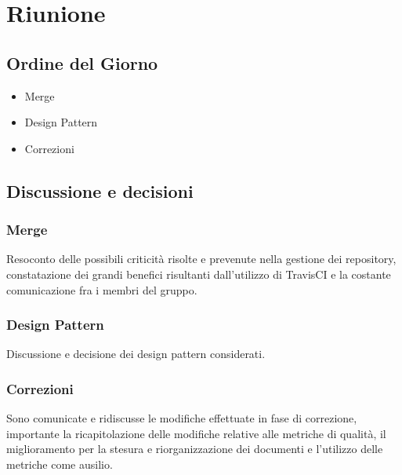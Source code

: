 \section{Riunione}
\subsection{Ordine del Giorno}
\begin{itemize}
	\item Merge
	\item Design Pattern
	\item Correzioni
\end{itemize}

\subsection{Discussione e decisioni}

\subsubsection{Merge}
Resoconto delle possibili criticità risolte e prevenute nella gestione dei repository, constatazione dei grandi benefici risultanti dall'utilizzo di TravisCI e la costante comunicazione fra i membri del gruppo.

\subsubsection{Design Pattern}
Discussione e decisione dei design pattern considerati.

\subsubsection{Correzioni}
Sono comunicate e ridiscusse le modifiche effettuate in fase di correzione, importante la ricapitolazione delle modifiche relative alle metriche di qualità, il miglioramento per la stesura e riorganizzazione dei documenti e l'utilizzo delle metriche come ausilio.


\clearpage
